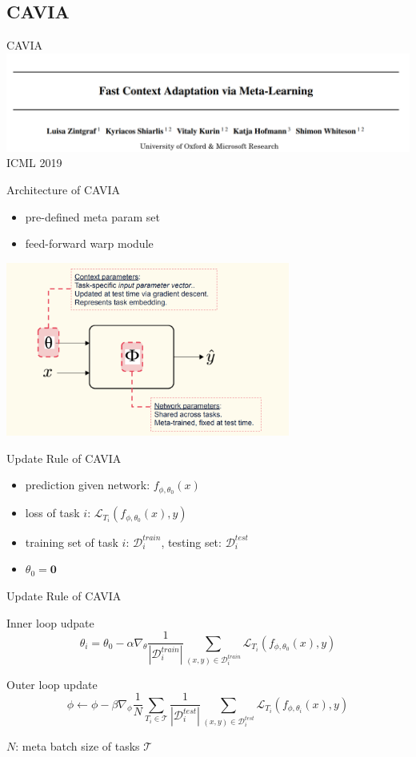 \documentclass{beamer}
\begin{document}
\subsection{CAVIA}
\begin{frame}{CAVIA}
  \includegraphics[width=\textwidth]{fig/CAVIA.png}
  \center ICML 2019
\end{frame}

\begin{frame}{Architecture of CAVIA}
  \begin{itemize}
    \item pre-defined meta param set
    \item feed-forward warp module
  \end{itemize}
  \center \includegraphics[width=0.7\textwidth]{fig/CAVIA-idea.png}
\end{frame}

\begin{frame}{Update Rule of CAVIA}
  \begin{itemize}
    \item prediction given network: $f_{\phi,\theta_0}(x)$
    \item loss of task $i$: $\mathcal{L}_{T_i}(f_{\phi,\theta_0}(x),y)$
    \item training set of task $i$: $\mathcal{D}_i^{train}$, testing set: $\mathcal{D}_i^{test}$
    \item $\theta_0 = \mathbf{0}$
  \end{itemize}
\end{frame}
\begin{frame}{Update Rule of CAVIA}
  \begin{block}{Inner loop udpate}
    \[\theta_i = \theta_0 - \alpha \nabla_{\theta} \frac{1}{|\mathcal{D}_i^{train}|}\sum_{(x,y) \in \mathcal{D}_i^{train}}\mathcal{L}_{T_i}(f_{\phi,\theta_0}(x),y)\]
  \end{block}

  \begin{block}{Outer loop update}
    \[ \phi \leftarrow \phi - \beta \nabla_{\phi}\frac{1}{N} \sum_{T_i \in \mathcal{T}} \frac{1}{|\mathcal{D}_i^{test}|} \sum_{(x,y) \in \mathcal{D}_i^{test}} \mathcal{L}_{T_i}(f_{\phi,\theta_i}(x),y)\]
  \end{block}
  $N$: meta batch size of tasks $\mathcal{T}$
\end{frame}
\end{document}
